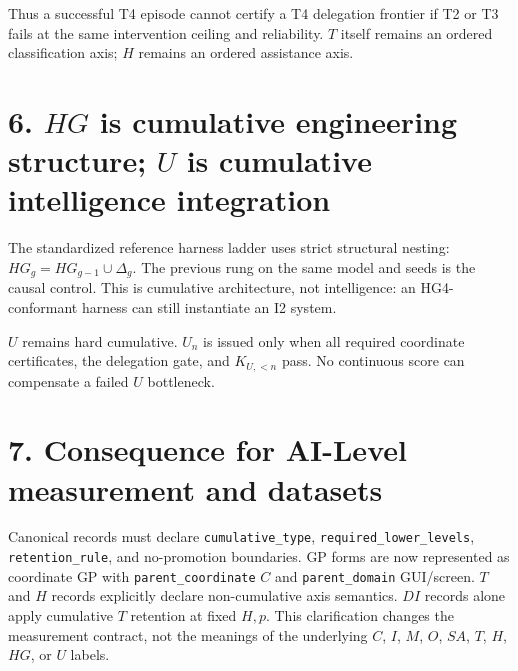 \documentclass[11pt]{article}
\begin{document}
Thus a successful T4 episode cannot certify a T4 delegation frontier if T2 or T3 fails at the same intervention ceiling and reliability. $T$ itself remains an ordered classification axis; $H$ remains an ordered assistance axis.

\section*{6. $HG$ is cumulative engineering structure; $U$ is cumulative intelligence integration}

The standardized reference harness ladder uses strict structural nesting: $HG_g = HG_{g-1} \cup \Delta_g$. The previous rung on the same model and seeds is the causal control. This is cumulative architecture, not intelligence: an HG4-conformant harness can still instantiate an I2 system.

$U$ remains hard cumulative. $U_n$ is issued only when all required coordinate certificates, the delegation gate, and $K_{U,<n}$ pass. No continuous score can compensate a failed $U$ bottleneck.

\section*{7. Consequence for AI-Level measurement and datasets}

Canonical records must declare \texttt{cumulative\_type}, \texttt{required\_lower\_levels}, \texttt{retention\_rule}, and no-promotion boundaries. GP forms are now represented as coordinate GP with \texttt{parent\_coordinate} $C$ and \texttt{parent\_domain} GUI/screen. $T$ and $H$ records explicitly declare non-cumulative axis semantics. $DI$ records alone apply cumulative $T$ retention at fixed $H, p$. This clarification changes the measurement contract, not the meanings of the underlying $C$, $I$, $M$, $O$, $SA$, $T$, $H$, $HG$, or $U$ labels.
\end{document}
